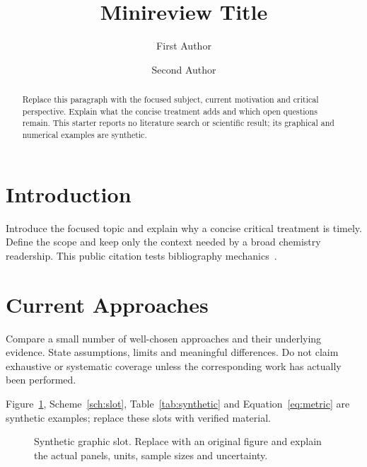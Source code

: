 \documentclass[serif,twocolumn]{prism-wiley-article}
\title{Minireview Title}
\author[1]{First Author}
\author[1,2]{Second Author}
\affil[1]{Department, First institution, City, Postal code, Country}
\affil[2]{Department, Second institution, City, Postal code, Country}
\begin{document}
\begin{frontmatter}
\maketitle
\begin{abstract}
Replace this paragraph with the focused subject, current motivation and
critical perspective. Explain what the concise treatment adds and which
open questions remain. This starter reports no literature search or
scientific result; its graphical and numerical examples are synthetic.
\end{abstract}
\end{frontmatter}

\section{Introduction}
Introduce the focused topic and explain why a concise critical treatment
is timely. Define the scope and keep only the context needed by a broad
chemistry readership. This public citation tests bibliography
mechanics~\cite{wilkinson2016fair}.

\section{Current Approaches}
Compare a small number of well-chosen approaches and their underlying
evidence. State assumptions, limits and meaningful differences. Do not
claim exhaustive or systematic coverage unless the corresponding work
has actually been performed.

Figure~\ref{fig:slot}, Scheme~\ref{sch:slot}, Table~\ref{tab:synthetic}
and Equation~\eqref{eq:metric} are synthetic examples; replace these slots
with verified material.

\begin{figure}[htbp]
\centering
{}
\caption{Synthetic graphic slot. Replace with an original figure and explain
the actual panels, units, sample sizes and uncertainty.}
\label{fig:slot}
\end{figure}
\end{document}
